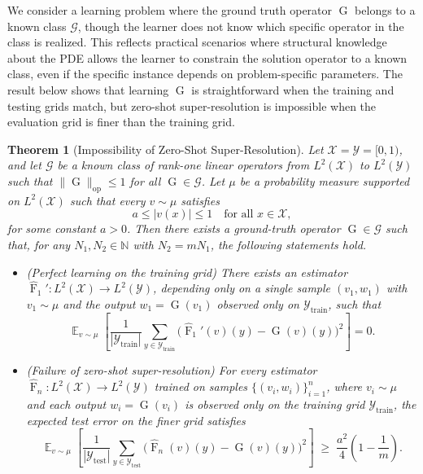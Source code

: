 \documentclass[11pt]{article}
\theoremstyle{plain}
\newtheorem{theorem}{Theorem}
\newcommand{\Gcal}{\mathcal{G}}
\newcommand{\Xcal}{\mathcal{X}}
\newcommand{\Ycal}{\mathcal{Y}}
\DeclareMathOperator*{\expect}{\mathbb{E}}
\begin{document}
We consider a learning problem where the ground truth operator $ \operatorname{G} $ belongs to a known class $ \Gcal $, though the learner does not know which specific operator in the class is realized. This reflects practical scenarios where structural knowledge about the PDE allows the learner to constrain the solution operator to a known class, even if the specific instance depends on problem-specific parameters. The result below shows that learning $ \operatorname{G} $ is straightforward when the training and testing grids match, but zero-shot super-resolution is impossible when the evaluation grid is finer than the training grid. 


\begin{theorem}[Impossibility of Zero-Shot Super-Resolution]
\label{thm:lb-general}
Let $\Xcal = \Ycal = [0,1)$, and let $\Gcal$ be a known class of rank-one linear operators from
$L^2(\Xcal)$ to $L^2(\Ycal)$ such that $\|\operatorname{G}\|_{\mathrm{op}} \le 1$ for all
$\operatorname{G} \in \Gcal$. Let $\mu$ be a probability measure supported on $L^2(\Xcal)$ such
that every $v \sim \mu$ satisfies
\[
a \le |v(x)| \le 1 \quad \text{for all } x \in \Xcal,
\]
for some constant $a > 0$. Then there exists a ground-truth operator $\operatorname{G} \in \Gcal$ such that, for any $ N_1, N_2 \in \mathbb{N} $ with $ N_2 = mN_1 $, the following
statements hold.

\begin{itemize}
\item[\emph{(i)}] \emph{(Perfect learning on the training grid)} 
There exists an estimator
$\widehat{\operatorname{F}}_1' : L^2(\Xcal) \to L^2(\Ycal)$, depending only on a single sample
$(v_1, w_1)$ with $v_1 \sim \mu$ and the output $w_1 = \operatorname{G}(v_1)$ observed only on
$\Ycal_{\mathrm{train}}$, such that
\[
\expect_{v \sim \mu}
\left[
\frac{1}{|\Ycal_{\mathrm{train}}|}
\sum_{y \in \Ycal_{\mathrm{train}}}
\bigl( \widehat{\operatorname{F}}_1'(v)(y) - \operatorname{G}(v)(y) \bigr)^2
\right]
= 0.
\]

\item[\emph{(ii)}] \emph{(Failure of zero-shot super-resolution)} 
For every estimator $\widehat{\operatorname{F}}_n : L^2(\Xcal) \to L^2(\Ycal)$ trained on samples
$\{(v_i, w_i)\}_{i=1}^n$, where $v_i \sim \mu$ and each output $w_i = \operatorname{G}(v_i)$ is
observed only on the training grid $\Ycal_{\mathrm{train}}$, the expected test error on the finer
grid satisfies
\[
\expect_{v \sim \mu}
\left[
\frac{1}{|\Ycal_{\mathrm{test}}|}
\sum_{y \in \Ycal_{\mathrm{test}}}
\bigl( \widehat{\operatorname{F}}_n(v)(y) - \operatorname{G}(v)(y) \bigr)^2
\right]
\;\ge\;
\frac{a^2}{4}\left(1 - \frac{1}{m}\right).
\]
\end{itemize}
\end{theorem}
\end{document}

